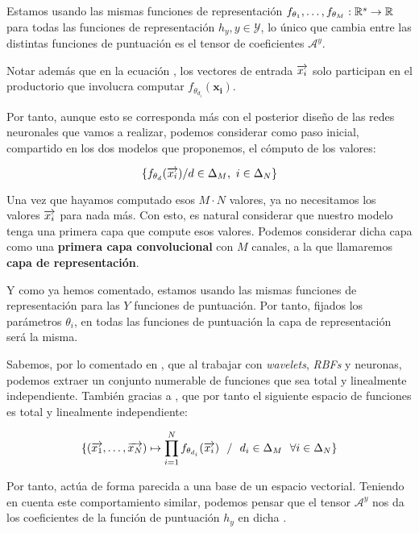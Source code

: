 \begin{observacion}

    Estamos usando las mismas funciones de representación $f_{\theta_1}, \ldots, f_{\theta_M}: \mathbb{R}^s \to \mathbb{R}$ para todas las funciones de representación $h_y, y \in \mathcal{Y}$, lo único que cambia entre las distintas funciones de puntuación es el tensor de coeficientes $\mathcal{A}^y$.


    Notar además que en la ecuación , los vectores de entrada $\overrightarrow{x_i}$ solo participan en el productorio que involucra computar $f_{\theta_{d_i}}(\mathbf{x_i})$.

    Por tanto, aunque esto se corresponda más con el posterior diseño de las redes neuronales que vamos a realizar, podemos considerar como paso inicial, compartido en los dos modelos que proponemos, el cómputo de los valores:

    $$\{f_{\theta_d}(\overrightarrow{x_i}) / d \in \Delta_{M},\ i \in \Delta_{N} \}$$

    Una vez que hayamos computado esos $M \cdot N$ valores, ya no necesitamos los valores $\overrightarrow{x_i}$ para nada más. Con esto, es natural considerar que nuestro modelo tenga una primera capa que compute esos valores. Podemos considerar dicha capa como una \textbf{primera capa convolucional} con $M$ canales, a la que llamaremos \textbf{capa de representación}.

    Y como ya hemos comentado, estamos usando las mismas funciones de representación para las $Y$ funciones de puntuación. Por tanto, fijados los parámetros $\theta_i$, en todas las funciones de puntuación la capa de representación será la misma.
\end{observacion}

\begin{observacion}
    Sabemos, por lo comentado en , que al trabajar con \textit{wavelets}, \textit{RBFs} y neuronas, podemos extraer un conjunto numerable de funciones que sea total y linealmente independiente. También gracias a , que por tanto el siguiente espacio de funciones es total y linealmente independiente:

    $$\{(\overrightarrow{x_1}, \ldots, \overrightarrow{x_N}) \mapsto \prod_{i = 1}^{N} f_{\theta_{d_i}} (\overrightarrow{x_i}) \ \  / \ \  d_i \in \Delta_{M} \ \  \forall i \in \Delta_{N}\}$$

    Por tanto, actúa de forma parecida a una base de un espacio vectorial. Teniendo en cuenta este comportamiento similar, podemos pensar que el tensor $\mathcal{A}^y$ nos da los coeficientes de la función de puntuación $h_y$ en dicha .

\end{observacion}

